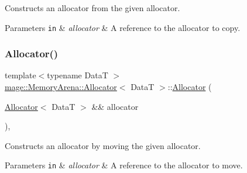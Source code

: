 Constructs an allocator from the given allocator.


\begin{DoxyParams}[1]{Parameters}
\mbox{\tt in}  & {\em allocator} & A reference to the allocator to copy. \\
\hline
\end{DoxyParams}
\hypertarget{structmage_1_1_memory_arena_1_1_allocator_a54ddc035b0987d71776c54a1240be18d}{}\label{structmage_1_1_memory_arena_1_1_allocator_a54ddc035b0987d71776c54a1240be18d} 
\subsubsection{\texorpdfstring{Allocator()}{Allocator()}\hspace{0.1cm}{\footnotesize\ttfamily [2/4]}}
{\footnotesize\ttfamily template$<$typename DataT $>$ \\
\hyperlink{structmage_1_1_memory_arena_1_1_allocator}{mage\+::\+Memory\+Arena\+::\+Allocator}$<$ DataT $>$\+::\hyperlink{structmage_1_1_memory_arena_1_1_allocator}{Allocator} (\begin{DoxyParamCaption}\item[{\hyperlink{structmage_1_1_memory_arena_1_1_allocator}{Allocator}$<$ DataT $>$ \&\&}]{allocator }\end{DoxyParamCaption})\hspace{0.3cm}{\ttfamily [default]}, {\ttfamily [noexcept]}}

Constructs an allocator by moving the given allocator.


\begin{DoxyParams}[1]{Parameters}
\mbox{\tt in}  & {\em allocator} & A reference to the allocator to move. \\
\hline
\end{DoxyParams}
\hypertarget{structmage_1_1_memory_arena_1_1_allocator_a9485ec7437c3c798a37c67631aa7e8ab}{}\label{structmage_1_1_memory_arena_1_1_allocator_a9485ec7437c3c798a37c67631aa7e8ab} 
